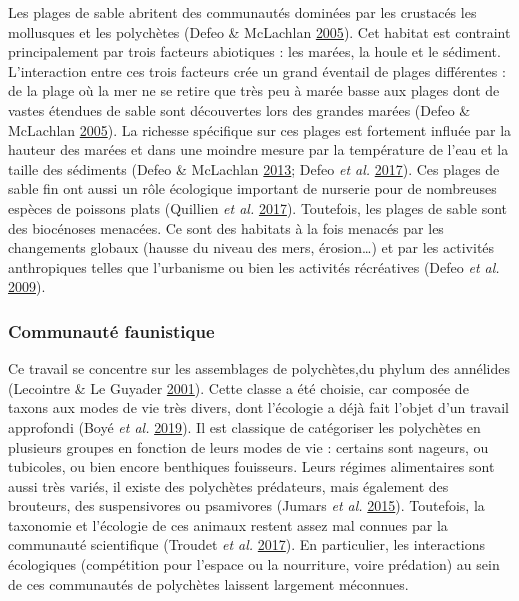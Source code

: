\documentclass[12pt,]{article}
\begin{document}
Les plages de sable abritent des communautés dominées par les crustacés
les mollusques et les polychètes (Defeo \& McLachlan
\protect\hyperlink{ref-Defeo_2005}{2005}). Cet habitat est contraint
principalement par trois facteurs abiotiques : les marées, la houle et
le sédiment. L'interaction entre ces trois facteurs crée un grand
éventail de plages différentes : de la plage où la mer ne se retire que
très peu à marée basse aux plages dont de vastes étendues de sable sont
découvertes lors des grandes marées (Defeo \& McLachlan
\protect\hyperlink{ref-Defeo_2005}{2005}). La richesse spécifique sur
ces plages est fortement influée par la hauteur des marées et dans une
moindre mesure par la température de l'eau et la taille des sédiments
(Defeo \& McLachlan \protect\hyperlink{ref-Defeo_2013}{2013}; Defeo
\emph{et al.} \protect\hyperlink{ref-Defeo_2017}{2017}). Ces plages de
sable fin ont aussi un rôle écologique important de nurserie pour de
nombreuses espèces de poissons plats (Quillien \emph{et al.}
\protect\hyperlink{ref-Quillien_2017}{2017}). Toutefois, les plages de
sable sont des biocénoses menacées. Ce sont des habitats à la fois
menacés par les changements globaux (hausse du niveau des mers,
érosion\ldots) et par les activités anthropiques telles que l'urbanisme
ou bien les activités récréatives (Defeo \emph{et al.}
\protect\hyperlink{ref-Defeo_2009}{2009}).

\hypertarget{communautuxe9-faunistique}{%
\subsubsection{Communauté faunistique}\label{communautuxe9-faunistique}}

Ce travail se concentre sur les assemblages de polychètes,du phylum des
annélides (Lecointre \& Le Guyader
\protect\hyperlink{ref-Lecointre_2001}{2001}). Cette classe a été
choisie, car composée de taxons aux modes de vie très divers, dont
l'écologie a déjà fait l'objet d'un travail approfondi (Boyé \emph{et
al.} \protect\hyperlink{ref-Boye_2019a}{2019}). Il est classique de
catégoriser les polychètes en plusieurs groupes en fonction de leurs
modes de vie : certains sont nageurs, ou tubicoles, ou bien encore
benthiques fouisseurs. Leurs régimes alimentaires sont aussi très
variés, il existe des polychètes prédateurs, mais également des
brouteurs, des suspensivores ou psamivores (Jumars \emph{et al.}
\protect\hyperlink{ref-Jumars_2015}{2015}). Toutefois, la taxonomie et
l'écologie de ces animaux restent assez mal connues par la communauté
scientifique (Troudet \emph{et al.}
\protect\hyperlink{ref-Troudet_2017}{2017}). En particulier, les
interactions écologiques (compétition pour l'espace ou la nourriture,
voire prédation) au sein de ces communautés de polychètes laissent
largement méconnues.
\end{document}
